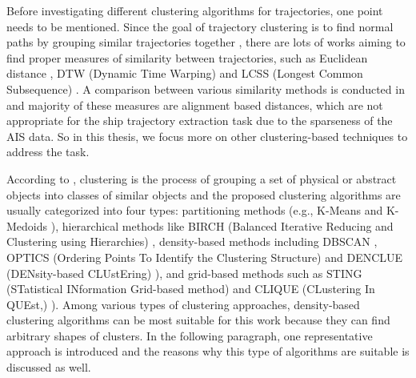 \documentclass[12pt,glossary]{dalcsthesis}
\begin{document}
Before investigating different clustering algorithms for trajectories, one point needs to be mentioned. %
Since the goal of trajectory clustering is to find normal paths  by grouping similar trajectories together \cite{Nicolas}, there are lots of works aiming to find proper measures of similarity between trajectories, such as Euclidean distance \cite{vehicle_clustering}, DTW (Dynamic Time Warping) \cite{dtw} and LCSS (Longest Common Subsequence) \cite{lcss}. A comparison between various similarity methods is conducted in \cite{comparison_distances} and majority of these measures are alignment based distances, which are not appropriate for the ship trajectory extraction task due to the sparseness of the AIS data. So in this thesis, we focus more on other clustering-based techniques to address the task.

According to \cite{hanjiaweibook}, clustering is the process of grouping a set of physical or abstract objects into classes of similar objects and the proposed clustering algorithms are usually categorized into four
types: partitioning methods (e.g., K-Means \cite{kmeans} and K-Medoids \cite{kmedoids}), hierarchical methods like BIRCH (Balanced Iterative Reducing and Clustering using Hierarchies) \cite{birch}, density-based methods including DBSCAN \cite{DBScan96}, OPTICS (Ordering Points To Identify the Clustering Structure) \cite{optics} and DENCLUE (DENsity-based
CLUstEring) \cite{denclue}), and grid-based methods such as STING (STatistical INformation Grid-based method) \cite{sting} and CLIQUE (CLustering In QUEst,) \cite{clique}).  Among various types of clustering approaches, density-based clustering algorithms can be most suitable for this work because they can find arbitrary shapes of clusters.  In the following paragraph, one representative approach is introduced and the reasons why this type of algorithms are suitable is discussed as well.
\end{document}
